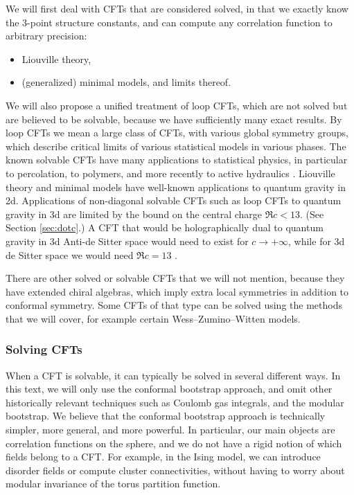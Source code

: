 \documentclass[12pt, a4paper]{article}
\theoremstyle{break}
\begin{document}
We will first deal with CFTs that are considered solved, in that we exactly know the 3-point structure constants, and can compute any correlation function to arbitrary precision:
\begin{itemize}
 \item Liouville theory,
 \item (generalized) minimal models, and limits thereof. 
\end{itemize}
We will also propose a unified treatment of loop CFTs, which are not solved but are believed to be solvable, because we have sufficiently many exact results. By loop CFTs we mean a large class of CFTs, with various global symmetry groups, which describe critical limits of various statistical models in various phases. The known solvable CFTs have many applications to statistical physics, in particular to percolation, to polymers, and more recently to active hydraulics \cite{jcpb23}. Liouville theory and minimal models have well-known applications to quantum gravity in 2d. Applications of non-diagonal solvable CFTs such as loop CFTs to quantum gravity in 3d are limited by the bound on the central charge $\Re c < 13$. (See Section \ref{sec:dotc}.) A CFT that would be holographically dual to quantum gravity in 3d Anti-de Sitter space would need to exist for $c\to+\infty$, while for 3d de Sitter space we would need $\Re c = 13$ \cite{god24, cemr24}. 

There are other solved or solvable CFTs that we will not mention, because they have extended chiral algebras, which imply extra local symmetries in addition to conformal symmetry. Some CFTs of that type can be solved using the methods that we will cover, for example certain Wess--Zumino--Witten models. 

\subsubsection*{Solving CFTs}

When a CFT is solvable, it can typically be solved in several different ways. In this text, we will only use the conformal bootstrap approach, and omit other historically relevant techniques such as Coulomb gas integrals, and the modular bootstrap. We believe that the conformal bootstrap approach is technically simpler, more general, and more powerful. In particular, our main objects are correlation functions on the sphere, and we do not have a rigid notion of which fields belong to a CFT. For example, in the Ising model, we can introduce disorder fields or compute cluster connectivities, without having to worry about modular invariance of the torus partition function. 
\end{document}
